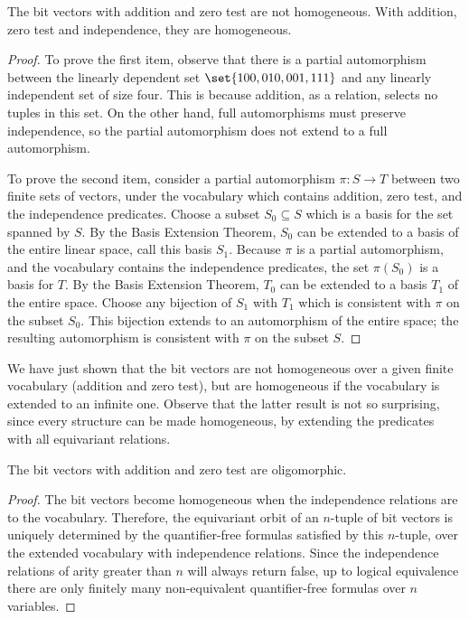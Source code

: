 \begin{lemma}
	The bit vectors with addition and zero test are not homogeneous. With addition, zero test and independence, they are homogeneous.
\end{lemma}
\begin{proof}
	To prove the first item, observe that 
 there is a partial automorphism between the linearly dependent set $\set{100,010,001,111}$ and any linearly independent set of size four. This is because addition, as a relation, selects no tuples in this set. On the other hand, full automorphisms must preserve independence, so the partial automorphism does not extend to a full automorphism.

To prove the second item, consider a partial automorphism $\pi : S \to T$ between two finite sets of vectors, under the vocabulary which contains addition, zero test, and the independence predicates. Choose a subset $S_0 \subseteq S$ which is a basis for the set spanned by $S$. By the Basis Extension Theorem, $S_0$ can be extended to a basis of the entire linear space, call this basis $S_1$. Because $\pi$ is a partial automorphism, and the vocabulary contains the independence predicates, the set $\pi(S_0)$ is a basis for $T$. By the Basis Extension Theorem, $T_0$ can be extended to a basis $T_1$ of the entire space. Choose any bijection of $S_1$ with $T_1$ which is consistent with $\pi$ on the subset $S_0$. This bijection extends to an automorphism of the entire space; the resulting automorphism is consistent with $\pi$ on the subset $S$.	
\end{proof}

We have just shown that the bit vectors are not homogeneous over a given finite vocabulary (addition and zero test), but are homogeneous if the vocabulary is extended to an infinite one. Observe that the latter result is not so surprising, since every structure can be made homogeneous, by extending the predicates with all equivariant relations.


\begin{lemma}
	The bit vectors with addition and zero test are oligomorphic.
\end{lemma}
\begin{proof}
	The bit vectors become homogeneous when the independence relations are to the vocabulary. Therefore, the equivariant orbit of an $n$-tuple of bit vectors is uniquely determined by the quantifier-free formulas satisfied by this $n$-tuple, over the extended vocabulary with independence relations. Since the independence relations of arity greater than $n$ will always return false, up to logical equivalence there are only finitely many non-equivalent quantifier-free formulas over $n$ variables.
\end{proof}

